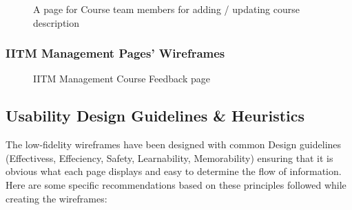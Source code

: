 \begin{figure}[H]
    \centering
    \caption{A page for Course team members for adding / updating course description}
    \label{fig:ctm_ae_description}
\end{figure}


\subsubsection{IITM Management Pages' Wireframes}
\begin{figure}[H]
    \centering
    \caption{IITM Management Course Feedback page}
    \label{fig:im_courses}
\end{figure}


\subsection{Usability Design Guidelines \& Heuristics}
The low-fidelity wireframes have been designed with common Design guidelines (Effectivess, Effeciency, Safety, Learnability, Memorability) ensuring that it is obvious what each page displays and easy to determine the flow of information. Here are some specific recommendations based on these principles followed while creating the wireframes:

